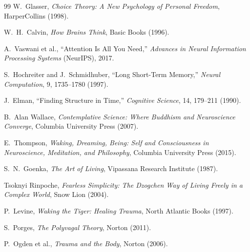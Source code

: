 \documentclass[12pt]{article}
\begin{document}
\begin{thebibliography}{99}
W.~Glasser,
\textit{Choice Theory: A New Psychology of Personal Freedom},
HarperCollins (1998).

W.~H.~Calvin,
\textit{How Brains Think},
Basic Books (1996).


A.~Vaswani et al.,
``Attention Is All You Need,''
\textit{Advances in Neural Information Processing Systems} (NeurIPS), 2017.

S.~Hochreiter and J.~Schmidhuber,
``Long Short-Term Memory,''
\textit{Neural Computation}, 9, 1735–1780 (1997).

J.~Elman,
``Finding Structure in Time,''
\textit{Cognitive Science}, 14, 179–211 (1990).


B.~Alan Wallace,
\textit{Contemplative Science: Where Buddhism and Neuroscience Converge},
Columbia University Press (2007).

E.~Thompson,
\textit{Waking, Dreaming, Being: Self and Consciousness in Neuroscience, Meditation, and Philosophy},
Columbia University Press (2015).

S.~N.~Goenka,
\textit{The Art of Living},
Vipassana Research Institute (1987).

Tsoknyi Rinpoche,
\textit{Fearless Simplicity: The Dzogchen Way of Living Freely in a Complex World},
Snow Lion (2004).


P.~Levine,
\textit{Waking the Tiger: Healing Trauma},
North Atlantic Books (1997).

S.~Porges,
\textit{The Polyvagal Theory},
Norton (2011).

P.~Ogden et al.,
\textit{Trauma and the Body},
Norton (2006).


\end{thebibliography}
\end{document}
